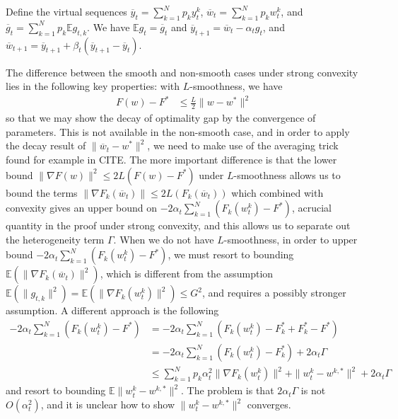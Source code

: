 Define the virtual sequences $\overline{y}_{t}=\sum_{k=1}^{N}p_{k}y_{t}^{k}$,
$\overline{w}_{t}=\sum_{k=1}^{N}p_{k}w_{t}^{k}$, and $\overline{g}_{t}=\sum_{k=1}^{N}p_{k}\mathbb{E}g_{t,k}$.
We have $\mathbb{E}g_{t}=\overline{g}_{t}$ and $\overline{y}_{t+1}=\overline{w}_{t}-\alpha_{t}g_{t}$,
and $\overline{w}_{t+1}=\overline{y}_{t+1}+\beta_{t}(\overline{y}_{t+1}-\overline{y}_{t})$. 
\begin{remark}
	The difference between the smooth and non-smooth cases under strong
	convexity lies in the following key properties: with $L$-smoothness,
	we have
	\begin{align*}
	F(w)-F^{\ast} & \leq\frac{L}{2}\|w-w^{\ast}\|^{2}
	\end{align*}
	so that we may show the decay of optimality gap by the convergence
	of parameters. This is not available in the non-smooth case, and in
	order to apply the decay result of $\|\overline{w}_{t}-w^{\ast}\|^{2}$,
	we need to make use of the averaging trick found for example in CITE.
	The more important difference is that the lower bound $\|\nabla F(w)\|^{2}\leq2L(F(w)-F^{\ast})$
	under $L$-smoothness allows us to bound the terms $\|\nabla F_{k}(\overline{w}_{t})\|\leq2L(F_{k}(\overline{w}_{t}))$
	which combined with convexity gives an upper bound on $-2\alpha_{t}\sum_{k=1}^{N}(F_{k}(w_{t}^{k})-F^{\ast})$,
	acrucial quantity in the proof under strong convexity, and this allows
	us to separate out the heterogeneity term $\Gamma$. When we do not
	have $L$-smoothness, in order to upper bound $-2\alpha_{t}\sum_{k=1}^{N}(F_{k}(w_{t}^{k})-F^{\ast})$,
	we must resort to bounding $\mathbb{E}(\|\nabla F_{k}(\overline{w}_{t})\|^{2})$,
	which is different from the assumption $\mathbb{E}(\|g_{t,k}\|^{2})=\mathbb{E}(\|\nabla F_{k}(w_{t}^{k})\|^{2})\leq G^{2}$,
	and requires a possibly stronger assumption. A different approach
	is the following 
	\begin{align*}
	-2\alpha_{t}\sum_{k=1}^{N}(F_{k}(w_{t}^{k})-F^{\ast}) & =-2\alpha_{t}\sum_{k=1}^{N}(F_{k}(w_{t}^{k})-F_{k}^{\ast}+F_{k}^{\ast}-F^{\ast})\\
	& =-2\alpha_{t}\sum_{k=1}^{N}(F_{k}(w_{t}^{k})-F_{k}^{\ast})+2\alpha_{t}\Gamma\\
	& \leq\sum_{k=1}^{N}p_{k}\alpha_{t}^{2}\|\nabla F_{k}(w_{t}^{k})\|^{2}+\|w_{t}^{k}-w^{k,\ast}\|^{2}+2\alpha_{t}\Gamma
	\end{align*}
	and resort to bounding $\mathbb{E}\|w_{t}^{k}-w^{k,\ast}\|^{2}$.
	The problem is that $2\alpha_{t}\Gamma$ is not $O(\alpha_{t}^{2})$,
	and it is unclear how to show $\|w_{t}^{k}-w^{k,\ast}\|^{2}$ converges. 
\end{remark}
